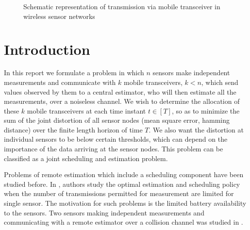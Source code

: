\documentclass[a4paper,english,12pt]{article}
\begin{document}
\begin{figure}[!b]
	
	
	\caption{Schematic representation of transmission via mobile transceiver in wireless sensor networks}
	
	
\end{figure}

\section{Introduction}


In this report we formulate a  problem in which $n$ sensors make independent measurements and communicate with $k$ mobile transceivers, $k<n$, which send values observed by them  to a central estimator, who will then estimate all the measurements, over a noiseless channel. We wish to determine the allocation of these $k$  mobile transceivers  at each time instant $t \in [T]$, so as to minimize the sum of the joint distortion of all sensor nodes (mean square error, hamming distance) over the finite length horizon of time $T$. We also want the distortion at individual sensors to be below certain thresholds, which can depend on the importance of the data arriving at the sensor nodes. This problem can be classified as a joint scheduling and estimation problem.

Problems of remote estimation which include a scheduling component have been studied before. In \cite{imer2005optimal}, \cite{imer2010optimal} authors study the optimal estimation  and scheduling policy when the number of transmissions permitted for measurement are limited for single sensor. The motivation for such problems is the limited battery availability to the sensors.
Two sensors making independent measurements and communicating with a remote estimator over a collision channel was studied in
\cite{vasconcelos2013estimation}. %
\end{document}
